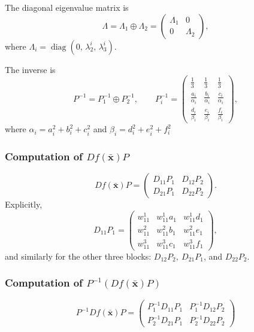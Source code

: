 \documentclass[12pt,a4paper]{article}
\theoremstyle{definition}
\begin{document}
The diagonal eigenvalue matrix is
\[
\Lambda = \Lambda_1 \oplus \Lambda_2 = \begin{pmatrix}
\Lambda_1 & 0 \\
0 & \Lambda_2
\end{pmatrix},
\]
where \(\Lambda_i = \operatorname{diag}(0,\, \lambda^i_2,\, \lambda^i_3)\).

The inverse is
\[
P^{-1} = P_1^{-1} \oplus P_2^{-1}, \qquad
P_i^{-1} = \begin{pmatrix}
\frac{1}{3} & \frac{1}{3} & \frac{1}{3} \\
\frac{a_i}{\alpha_i} & \frac{b_i}{\alpha_i} & \frac{c_i}{\alpha_i} \\
\frac{d_i}{\beta_i} & \frac{e_i}{\beta_i} & \frac{f_i}{\beta_i}
\end{pmatrix},
\]
where \(\alpha_i=a_i^2+b_i^2+c_i^2\) and \(\beta_i=d_i^2+e_i^2+f_i^2\)
\subsubsection*{Computation of  \(Df(\bar{\mathbf{x}})P\)}
\[
Df(\bar{\mathbf{x}})P = \begin{pmatrix}
D_{11}P_1 & D_{12}P_2 \\
D_{21}P_1 & D_{22}P_2
\end{pmatrix}.
\]
Explicitly,
\[
D_{11}P_1 = \begin{pmatrix}
w^1_{11} & w^1_{11}a_1 & w^1_{11}d_1 \\
w^2_{11} & w^2_{11}b_1 & w^2_{11}e_1 \\
w^3_{11} & w^3_{11}c_1 & w^3_{11}f_1
\end{pmatrix},
\]
and similarly for the other three blocks: \(D_{12}P_2, ~D_{21}P_1\), and \(D_{22}P_2\).

\subsubsection*{Computation of \(P^{-1}(Df(\bar{\mathbf{x}})P)\)}
\[
P^{-1}Df(\bar{\mathbf{x}})P = \begin{pmatrix}
P_1^{-1}D_{11}P_1 & P_1^{-1}D_{12}P_2 \\
P_2^{-1}D_{21}P_1 & P_2^{-1}D_{22}P_2
\end{pmatrix}
\]
\end{document}
